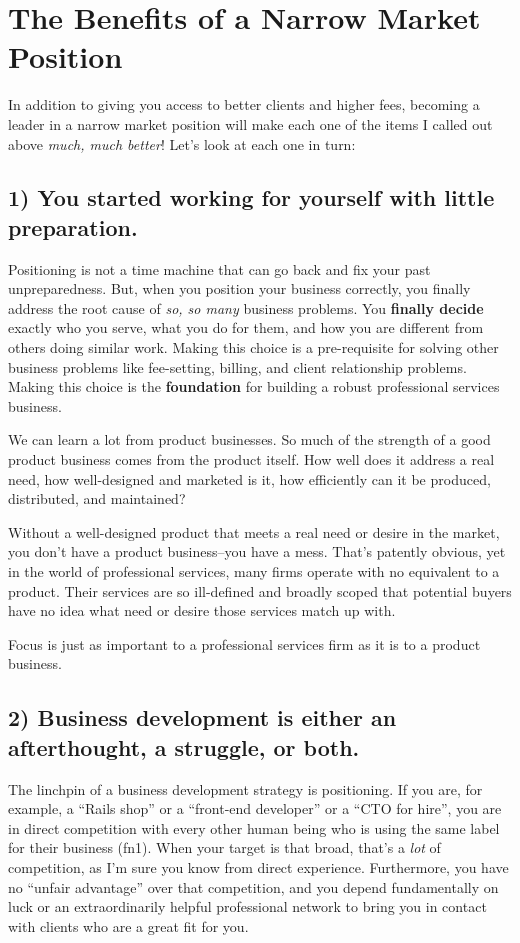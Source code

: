 \section{The Benefits of a Narrow Market Position}

In addition to giving you access to better clients and higher fees, becoming a leader in a narrow market position will make each one of the items I called out above \emph{much, much better}! Let's look at each one in turn:

\subsection{1) \textbf{You started working for yourself with little preparation}.}

Positioning is not a time machine that can go back and fix your past unpreparedness. But, when you position your business correctly, you finally address the root cause of \emph{so, so many} business problems. You \textbf{finally decide} exactly who you serve, what you do for them, and how you are different from others doing similar work. Making this choice is a pre-requisite for solving other business problems like fee-setting, billing, and client relationship problems. Making this choice is the \textbf{foundation} for building a robust professional services business.

We can learn a lot from product businesses. So much of the strength of a good product business comes from the product itself. How well does it address a real need, how well-designed and marketed is it, how efficiently can it be produced, distributed, and maintained?

Without a well-designed product that meets a real need or desire in the market, you don't have a product business--you have a mess. That's patently obvious, yet in the world of professional services, many firms operate with no equivalent to a product. Their services are so ill-defined and broadly scoped that potential buyers have no idea what need or desire those services match up with.

Focus is just as important to a professional services firm as it is to a product business.

\subsection{2) \textbf{Business development is either an afterthought, a struggle, or both}.}

The linchpin of a business development strategy is positioning. If you are, for example, a ``Rails shop'' or a ``front-end developer'' or a ``CTO for hire'', you are in direct competition with every other human being who is using the same label for their business (fn1). When your target is that broad, that's a \emph{lot} of competition, as I'm sure you know from direct experience. Furthermore, you have no ``unfair advantage'' over that competition, and you depend fundamentally on luck or an extraordinarily helpful professional network to bring you in contact with clients who are a great fit for you.

